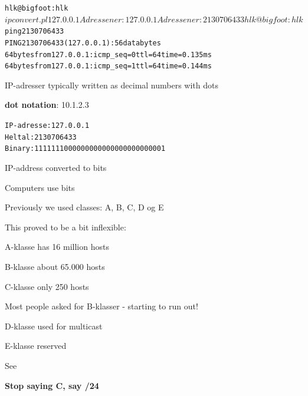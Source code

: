 \documentclass[Screen16to9,17pt]{foils}
\begin{document}

\begin{alltt}
hlk@bigfoot:hlk$ ipconvert.pl 127.0.0.1
Adressen er: 127.0.0.1
Adressen er: 2130706433
hlk@bigfoot:hlk$ ping 2130706433
PING 2130706433 (127.0.0.1): 56 data bytes
64 bytes from 127.0.0.1: icmp_seq=0 ttl=64 time=0.135 ms
64 bytes from 127.0.0.1: icmp_seq=1 ttl=64 time=0.144 ms
\end{alltt}

\begin{list1}
\item IP-adresser typically written as decimal numbers with dots
\item {\bf dot notation}: 10.1.2.3
\end{list1}


\begin{alltt}
IP-adresse: 127.0.0.1
Heltal:	2130706433
Binary:	1111111000000000000000000000001
\end{alltt}

\begin{list1}
\item IP-address converted to bits
\item Computers use bits
\end{list1}


\begin{list1}
\item Previously we used classes: A, B, C, D og E
\item This proved to be a bit inflexible:
\begin{list2}
\item A-klasse has 16 million hosts
\item B-klasse about 65.000 hosts
\item C-klasse only 250 hosts
\end{list2}
\item Most people asked for B-klasser - starting to run out!
\item D-klasse used for multicast
\item E-klasse reserved
\item See 
\end{list1}

\vskip 5mm
\centerline{\bf Stop saying C, say /24}


\end{document}
